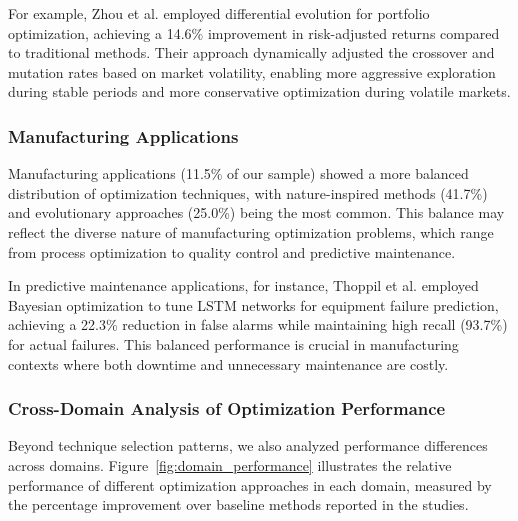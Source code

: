 For example, Zhou et al. \citep{Zhou20211} employed differential evolution for portfolio optimization, achieving a 14.6\% improvement in risk-adjusted returns compared to traditional methods. Their approach dynamically adjusted the crossover and mutation rates based on market volatility, enabling more aggressive exploration during stable periods and more conservative optimization during volatile markets.

\subsubsection{Manufacturing Applications}
Manufacturing applications (11.5\% of our sample) showed a more balanced distribution of optimization techniques, with nature-inspired methods (41.7\%) and evolutionary approaches (25.0\%) being the most common. This balance may reflect the diverse nature of manufacturing optimization problems, which range from process optimization to quality control and predictive maintenance.

In predictive maintenance applications, for instance, Thoppil et al. \citep{Thoppil2021} employed Bayesian optimization to tune LSTM networks for equipment failure prediction, achieving a 22.3\% reduction in false alarms while maintaining high recall (93.7\%) for actual failures. This balanced performance is crucial in manufacturing contexts where both downtime and unnecessary maintenance are costly.

\subsubsection{Cross-Domain Analysis of Optimization Performance}
Beyond technique selection patterns, we also analyzed performance differences across domains. Figure~\ref{fig:domain_performance} illustrates the relative performance of different optimization approaches in each domain, measured by the percentage improvement over baseline methods reported in the studies.

